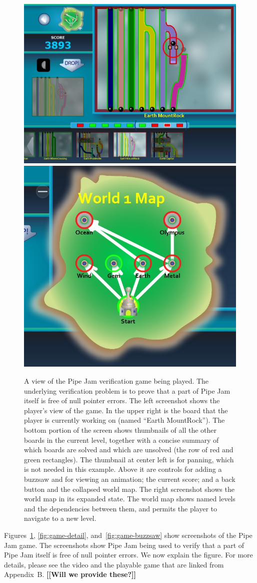 \documentclass{sig-alternate}
\newcommand{\todo}[1]{{\color{red}\bfseries [[#1]]}}
\begin{document}
\begin{figure}
\begin{center}
\includegraphics[width=.49\textwidth]{images/allUI-world1}%
\hfill%
\includegraphics[width=.35\textwidth]{images/world-map}

\end{center}
\vspace{-10pt}
\caption{
  A view of the Pipe Jam verification game being played.  The underlying
  verification problem is to prove that a part of Pipe Jam itself is free of
  null pointer errors.
  \newline
  The left screenshot shows the player's view of the game.
  In the upper right is the board that the player is currently
  working on (named ``Earth MountRock'').
  The bottom portion of the screen shows thumbnails of all the
  other boards in the current level, together with a concise summary of
  which boards are solved and which are unsolved (the row  of red and green
  rectangles).  The thumbnail at center left is for panning, which is not
  needed in
  this example.  Above it are controls for adding a buzzsaw and for
  viewing an animation; the current score; and a back button and the
  collapsed world map.
  \newline
  The right screenshot shows the world map in its expanded state.  The
  world map shows named levels and the dependencies between them, and 
  permits the player to navigate to a new level.
}
\label{fig:game-overview}
\end{figure}


Figures~\ref{fig:game-overview}, \ref{fig:game-detail},
and~\ref{fig:game-buzzsaw} show screenshots of the Pipe Jam game.  The
screenshots show Pipe Jam being used to verify that a part of Pipe Jam
itself is free of null pointer errors.  We now explain the figure.
For more details, please see the video and the playable game that are
linked from Appendix~B\@. \todo{Will we provide these?}
\end{document}
